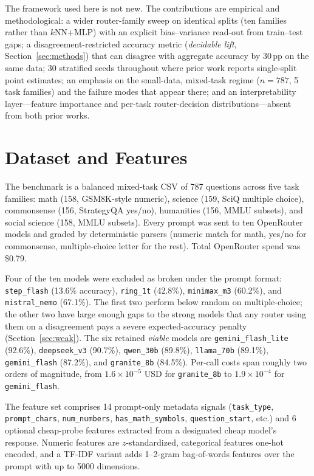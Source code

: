 \documentclass[11pt]{article}
\begin{document}
The framework used here is not new. The contributions are empirical and methodological: a wider router-family sweep on identical splits (ten families rather than $k$NN+MLP) with an explicit bias--variance read-out from train--test gaps; a disagreement-restricted accuracy metric (\emph{decidable lift}, Section~\ref{sec:methods}) that can disagree with aggregate accuracy by 30\,pp on the same data; 30 stratified seeds throughout where prior work reports single-split point estimates; an emphasis on the small-data, mixed-task regime ($n{=}787$, 5 task families) and the failure modes that appear there; and an interpretability layer---feature importance and per-task router-decision distributions---absent from both prior works.

\section{Dataset and Features}
The benchmark is a balanced mixed-task CSV of 787 questions across five task families: math (158, GSM8K-style numeric), science (159, SciQ multiple choice), commonsense (156, StrategyQA yes/no), humanities (156, MMLU subsets), and social science (158, MMLU subsets). Every prompt was sent to ten OpenRouter models and graded by deterministic parsers (numeric match for math, yes/no for commonsense, multiple-choice letter for the rest). Total OpenRouter spend was \$0.79.

Four of the ten models were excluded as broken under the prompt format: \texttt{step\_flash} (13.6\% accuracy), \texttt{ring\_1t} (42.8\%), \texttt{minimax\_m3} (60.2\%), and \texttt{mistral\_nemo} (67.1\%). The first two perform below random on multiple-choice; the other two have large enough gaps to the strong models that any router using them on a disagreement pays a severe expected-accuracy penalty (Section~\ref{sec:weak}). The six retained \emph{viable} models are \texttt{gemini\_flash\_lite} (92.6\%), \texttt{deepseek\_v3} (90.7\%), \texttt{qwen\_30b} (89.8\%), \texttt{llama\_70b} (89.1\%), \texttt{gemini\_flash} (87.2\%), and \texttt{granite\_8b} (84.5\%). Per-call costs span roughly two orders of magnitude, from $1.6\times10^{-5}$ USD for \texttt{granite\_8b} to $1.9\times10^{-4}$ for \texttt{gemini\_flash}.

The feature set comprises 14 prompt-only metadata signals (\texttt{task\_type}, \texttt{prompt\_chars}, \texttt{num\_numbers}, \texttt{has\_math\_symbols}, \texttt{question\_start}, etc.) and 6 optional cheap-probe features extracted from a designated cheap model's response. Numeric features are $z$-standardized, categorical features one-hot encoded, and a TF-IDF variant adds 1--2-gram bag-of-words features over the prompt with up to 5000 dimensions.
\end{document}
